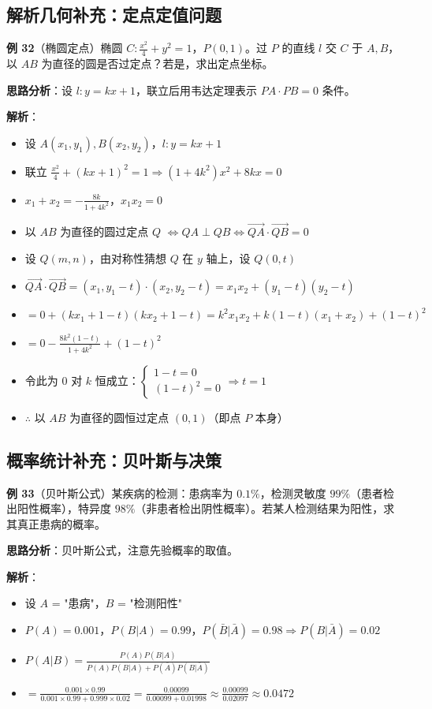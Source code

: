 \subsection{解析几何补充：定点定值问题}

\textbf{例 32}（椭圆定点）椭圆 $C:\frac{x^2}{4}+y^2=1$，$P(0,1)$。过 $P$ 的直线 $l$ 交 $C$ 于 $A,B$，以 $AB$ 为直径的圆是否过定点？若是，求出定点坐标。

\textbf{思路分析}：设 $l:y=kx+1$，联立后用韦达定理表示 $PA\cdot PB=0$ 条件。

\textbf{解析}：
\begin{itemize}
  \item 设 $A(x_1,y_1),B(x_2,y_2)$，$l:y=kx+1$
  \item 联立 $\frac{x^2}{4}+(kx+1)^2=1 \Rightarrow (1+4k^2)x^2+8kx=0$
  \item $x_1+x_2=-\frac{8k}{1+4k^2}$，$x_1x_2=0$
  \item 以 $AB$ 为直径的圆过定点 $Q$ $\iff QA\perp QB \iff \overrightarrow{QA}\cdot\overrightarrow{QB}=0$
  \item 设 $Q(m,n)$，由对称性猜想 $Q$ 在 $y$ 轴上，设 $Q(0,t)$
  \item $\overrightarrow{QA}\cdot\overrightarrow{QB} = (x_1,y_1-t)\cdot(x_2,y_2-t)=x_1x_2+(y_1-t)(y_2-t)$
  \item $=0+(kx_1+1-t)(kx_2+1-t) = k^2x_1x_2+k(1-t)(x_1+x_2)+(1-t)^2$
  \item $=0 - \frac{8k^2(1-t)}{1+4k^2} + (1-t)^2$
  \item 令此为 $0$ 对 $k$ 恒成立：$\begin{cases} 1-t=0 \\ (1-t)^2=0 \end{cases} \Rightarrow t=1$
  \item $\therefore$ 以 $AB$ 为直径的圆恒过定点 $(0,1)$（即点 $P$ 本身）
\end{itemize}

\subsection{概率统计补充：贝叶斯与决策}

\textbf{例 33}（贝叶斯公式）某疾病的检测：患病率为 $0.1\%$，检测灵敏度 $99\%$（患者检出阳性概率），特异度 $98\%$（非患者检出阴性概率）。若某人检测结果为阳性，求其真正患病的概率。

\textbf{思路分析}：贝叶斯公式，注意先验概率的取值。

\textbf{解析}：
\begin{itemize}
  \item 设 $A$ = "患病"，$B$ = "检测阳性"
  \item $P(A)=0.001$，$P(B|A)=0.99$，$P(\bar B|\bar A)=0.98 \Rightarrow P(B|\bar A)=0.02$
  \item $P(A|B)=\frac{P(A)P(B|A)}{P(A)P(B|A)+P(\bar A)P(B|\bar A)}$
  \item $=\frac{0.001\times0.99}{0.001\times0.99+0.999\times0.02} = \frac{0.00099}{0.00099+0.01998} \approx \frac{0.00099}{0.02097} \approx 0.0472$
\end{itemize}

